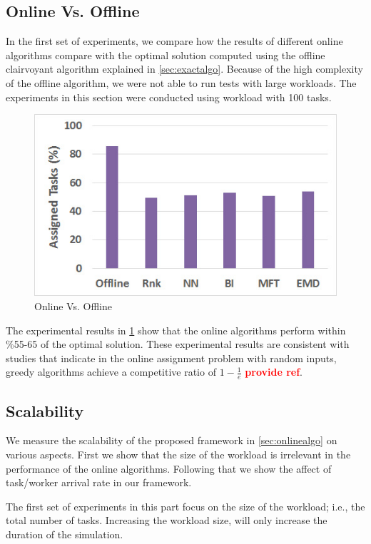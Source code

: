 \subsection{Online Vs. Offline}
In the first set of experiments, we compare how the results of different online algorithms compare with the optimal solution computed using the offline clairvoyant algorithm explained in \cref{sec:exactalgo}. Because of the high complexity of the offline algorithm, we were not able to run tests with large workloads. The experiments in this section were conducted using workload with 100 tasks.

\begin{figure}[h]
	\centering
	\includegraphics[width = 0.6\columnwidth]{figures/off_vs_on.jpg}
	\vspace{-0.1in}
	\caption{Online Vs. Offline}\label{fig:off_vs_on}
\end{figure}

The experimental results in \cref{fig:off_vs_on} show that the online algorithms perform within \%55-65 of the optimal solution. These experimental results are consistent with studies that indicate in the online assignment problem with random inputs, greedy algorithms achieve a competitive ratio of $1 - \frac{1}{e}$ \textcolor{red}{\textbf{provide ref}}.

\subsection{Scalability}
We measure the scalability of the proposed framework in \cref{sec:onlinealgo} on various aspects. First we show that the size of the workload is irrelevant in the performance of the online algorithms. Following that we show the affect of task/worker arrival rate in our framework.

The first set of experiments in this part focus on the size of the workload; i.e., the total number of tasks. Increasing the workload size, will only increase the duration of the simulation.

